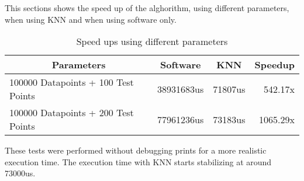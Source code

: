 This sections shows the speed up of the alghorithm, using different parameters, when using KNN and when using software only.
\begin{table}[H]
\begin{minipage}{\linewidth}
\centering
\begin{tabular}{|lccr|}
\hline
\multicolumn{1}{|c|}{\textbf{Parameters}} & \multicolumn{1}{c|}{\textbf{Software}} & \multicolumn{1}{c|}{\textbf{KNN}} & \multicolumn{1}{c|}{\textbf{Speedup}} \\ \hline
\rowcolor{iob-blue}
100000 Datapoints + 100 Test Points                                          & 38931683us                                      & 71807us                                 & 542.17x                                     \\
100000 Datapoints + 200 Test Points                                           & 77961236us                                      & 73183us                                 &  1065.29x                                     \\ \hline
\end{tabular}
\end{minipage}
\caption{Speed ups using different parameters}
\end{table}

These tests were performed without debugging prints for a more realistic execution time. The execution time with KNN starts stabilizing at around 73000us.
